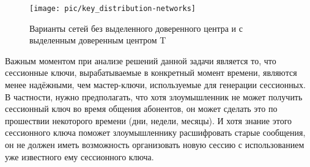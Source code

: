 \begin{figure}[!htb]
    \centering
    \texttt{[image: pic/key\_distribution-networks]}
    \caption{Варианты сетей без выделенного доверенного центра и с выделенным доверенным центром T\label{fig:key_distribution-networks}}
\end{figure}

Важным моментом при анализе решений данной задачи является то, что сессионные ключи, вырабатываемые в конкретный момент времени, являются менее надёжными, чем мастер-ключи, используемые для генерации сессионных. В частности, нужно предполагать, что хотя злоумышленник не может получить сессионный ключ во время общения абонентов, он может сделать это по прошествии некоторого времени (дни, недели, месяцы). И хотя знание этого сессионного ключа поможет злоумышленнику расшифровать старые сообщения, он не должен иметь возможность организовать новую сессию с использованием уже известного ему сессионного ключа.








